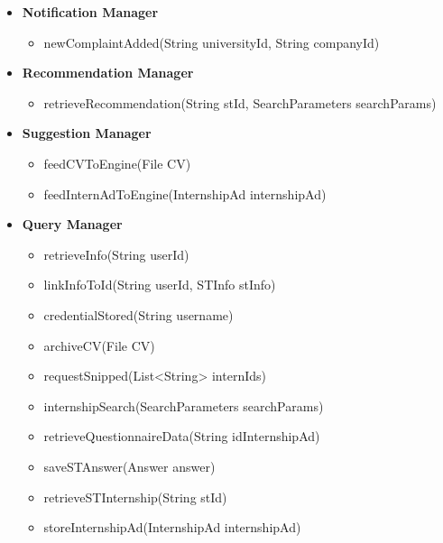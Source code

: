 \begin{itemize}
      \item \textbf{Notification Manager}
          \begin{itemize}
              \item newComplaintAdded(String universityId, String companyId)
          \end{itemize}
  
      \item \textbf{Recommendation Manager}
          \begin{itemize}
              \item retrieveRecommendation(String stId, SearchParameters searchParams)
          \end{itemize}
  
      \item \textbf{Suggestion Manager}
          \begin{itemize}
              \item feedCVToEngine(File CV)
              \item feedInternAdToEngine(InternshipAd internshipAd)
          \end{itemize}
  
      \item \textbf{Query Manager}
          \begin{itemize}
              \item retrieveInfo(String userId)
              \item linkInfoToId(String userId, STInfo stInfo)
              \item credentialStored(String username)
              \item archiveCV(File CV)
              \item requestSnipped(List<String> internIds)
              \item internshipSearch(SearchParameters searchParams)
              \item retrieveQuestionnaireData(String idInternshipAd)
              \item saveSTAnswer(Answer answer)
              \item retrieveSTInternship(String stId)
              \item storeInternshipAd(InternshipAd internshipAd)
          \end{itemize}
  

\end{itemize}
